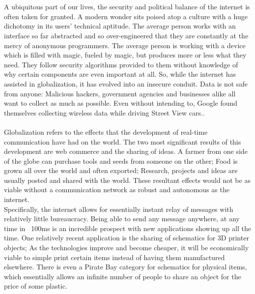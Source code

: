 \documentclass[11pt]{article}
\begin{document}

\pagebreak

\section*{}

\paragraph{}
A ubiquitous part of our lives, the security and political balance of the internet is often taken for granted. A modern wonder sits poised atop a culture with a huge dichotomy in its users' technical aptitude. The average person works with an interface so far abstracted and so over-engineered that they are constantly at the mercy of anonymous programmers. The average person is working with a device which is filled with magic, fueled by magic, but produces more or less what they need. They follow security algorithms provided to them without knowledge of why certain components are even important at all. So, while the internet has assisted in globalization, it has evolved into an insecure conduit. Data is not safe from anyone: Malicious hackers, government agencies and businesses alike all want to collect as much as possible. Even without intending to, Google found themselves collecting wireless data while driving Street View cars.\cite{reuters_google_data}.

\paragraph{}
Globalization refers to the effects that the development of real-time communication have had on the world. The two most significant results of this development are web commerce and the sharing of ideas. A farmer from one side of the globe can purchase tools and seeds from someone on the other; Food is grown all over the world and often exported; Research, projects and ideas are usually posted and shared with the world. These resultant effects would not be as viable without a communication network as robust and autonomous as the internet. \\
Specifically, the internet allows for essentially instant relay of messages with relatively little bureaucracy. Being able to send any message anywhere, at any time in ~100ms is an incredible prospect with new applications showing up all the time. One relatively recent application is the sharing of schematics for 3D printer objects; As the technologies improve and become cheaper, it will be economically viable to simple print certain items instead of having them manufactured elsewhere. There is even a Pirate Bay category\cite{pirate_bay_physibles} for schematics for physical items, which essentially allows an infinite number of people to share an object for the price of some plastic.
\end{document}
